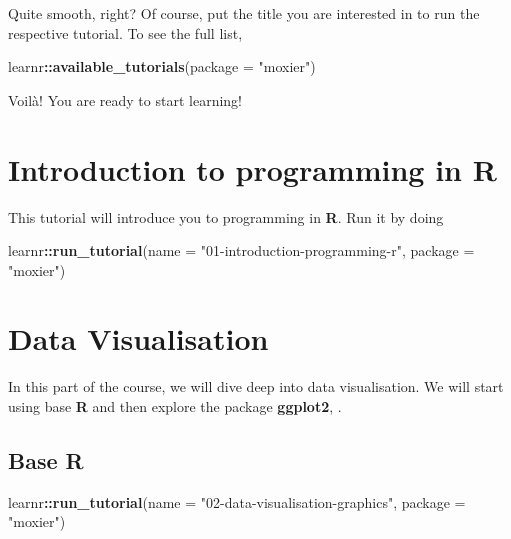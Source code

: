 \documentclass[]{book}
\newenvironment{Shaded}{\begin{snugshade}}{\end{snugshade}}
\newcommand{\KeywordTok}[1]{\textcolor[rgb]{0.13,0.29,0.53}{\textbf{#1}}}
\newcommand{\DataTypeTok}[1]{\textcolor[rgb]{0.13,0.29,0.53}{#1}}
\newcommand{\StringTok}[1]{\textcolor[rgb]{0.31,0.60,0.02}{#1}}
\newcommand{\OperatorTok}[1]{\textcolor[rgb]{0.81,0.36,0.00}{\textbf{#1}}}
\newcommand{\NormalTok}[1]{#1}
\begin{document}
Quite smooth, right? Of course, put the title you are interested in to
run the respective tutorial. To see the full list,

\begin{Shaded}
\begin{Highlighting}[]
\NormalTok{learnr}\OperatorTok{::}\KeywordTok{available_tutorials}\NormalTok{(}\DataTypeTok{package =} \StringTok{"moxier"}\NormalTok{)}
\end{Highlighting}
\end{Shaded}

Voilà! You are ready to start learning!

\chapter{Introduction to programming in
R}\label{introduction-to-programming-in-r}

This tutorial will introduce you to programming in \textbf{R}. Run it by
doing

\begin{Shaded}
\begin{Highlighting}[]
\NormalTok{learnr}\OperatorTok{::}\KeywordTok{run_tutorial}\NormalTok{(}\DataTypeTok{name =} \StringTok{"01-introduction-programming-r"}\NormalTok{,}
                     \DataTypeTok{package =} \StringTok{"moxier"}\NormalTok{)}
\end{Highlighting}
\end{Shaded}

\chapter{Data Visualisation}\label{data-visualisation}

In this part of the course, we will dive deep into data visualisation.
We will start using base \textbf{R} and then explore the package
\textbf{ggplot2}, \citep{R-ggplot2}.

\section{\texorpdfstring{Base \textbf{R}}{Base R}}\label{base-r}

\begin{Shaded}
\begin{Highlighting}[]
\NormalTok{learnr}\OperatorTok{::}\KeywordTok{run_tutorial}\NormalTok{(}\DataTypeTok{name =} \StringTok{"02-data-visualisation-graphics"}\NormalTok{,}
                     \DataTypeTok{package =} \StringTok{"moxier"}\NormalTok{)}
\end{Highlighting}
\end{Shaded}
\end{document}
